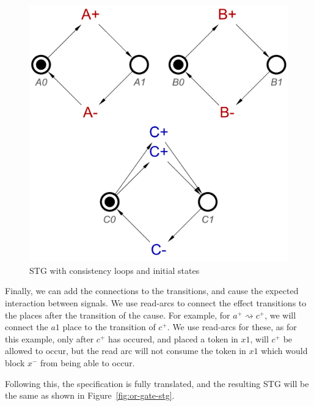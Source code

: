 \documentclass[british,conference,compsoc]{IEEEtran}
\begin{document}
\begin{figure}[h]
\vspace{-4mm}
\begin{centering}
\includegraphics[scale=0.3]{Images/or-gate-inits-stg}
\par\end{centering}
\protect\caption{\label{fig:tokens} STG with consistency loops and 
			initial states}
\vspace{-1mm}
\end{figure}

Finally, we can add the connections to the transitions, and cause the 
expected interaction between signals. We use read-arcs to connect the effect
transitions to the places after the transition of the cause. For example, for
$a^{+} \rightsquigarrow c^{+}$, we will connect the $a1$ place to the 
transition of $c^{+}$. We use read-arcs for these, as for this example, only
after $c^{+}$ has occured, and placed a token in $x1$, will $c^{+}$ be allowed
to occur, but the read arc will not consume the token in $x1$ which would block
$x^{-}$ from being able to occur. 

Following this, the specification is fully translated, and the resulting STG 
will be the same as shown in Figure~\ref{fig:or-gate-stg}.
\end{document}
